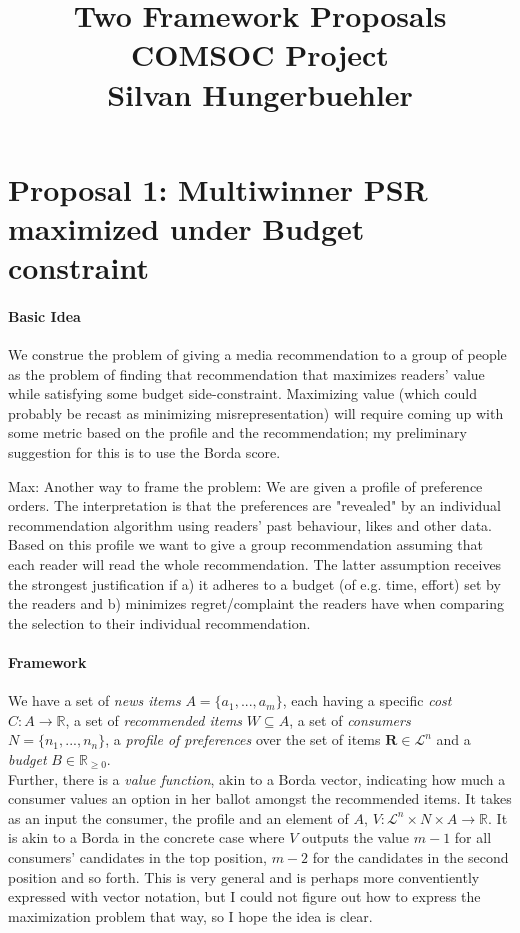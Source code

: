 \documentclass[10pt,a4paper]{article}
\title{
  Two Framework Proposals\\ \large COMSOC Project
\\
  \large Silvan Hungerbuehler}
\date{}
\begin{document}
\maketitle
\section{Proposal 1: Multiwinner PSR maximized under Budget constraint}
\paragraph{Basic Idea}
We construe the problem of giving a media recommendation to a group of people as the problem of finding that recommendation that maximizes readers' value while satisfying some budget side-constraint. Maximizing value (which could probably be recast as minimizing misrepresentation) will require coming up with some metric based on the profile and the recommendation; my preliminary suggestion for this is to use the Borda score.

Max: Another way to frame the problem: We are given a profile of preference orders. The interpretation is that the preferences
are "revealed" by an individual recommendation algorithm using readers' past behaviour, likes and other data. Based on this profile we want to give a group recommendation assuming that each reader will read the whole recommendation. The latter assumption receives the strongest justification if a) it adheres to a budget (of e.g. time, effort) set by the readers and b) minimizes regret/complaint the readers have when comparing the selection to their individual recommendation.

\paragraph{Framework}
We have a set of \emph{news items} $A=\{a_1,...,a_m\}$, each having a specific \emph{cost} $C: A\rightarrow \mathbb{R}$, a set of \emph{recommended items} $W\subseteq A$, a set of \emph{consumers} $N=\{n_1,...,n_n\}$, a \emph{profile of preferences} over the set of items $\mathbf{R}\in \mathcal{L}^n$ and a \emph{budget} $B\in \mathbb{R}_{\geq 0}$.\\
Further, there is a \emph{value function}, akin to a Borda vector, indicating how much a consumer values an option in her ballot amongst the recommended items. It takes as an input the consumer, the profile and an element of $A$,  $V: \mathcal{L}^n \times N \times  A \rightarrow \mathbb{R}$. It is akin to a Borda in the concrete case where $V$ outputs the value $m-1$ for all consumers' candidates in the top position, $m-2$ for the candidates in the second position and so forth. This is very general and is perhaps more conventiently expressed with vector notation, but I could not figure out how to express the maximization problem that way, so I hope the idea is clear.\\
\end{document}

